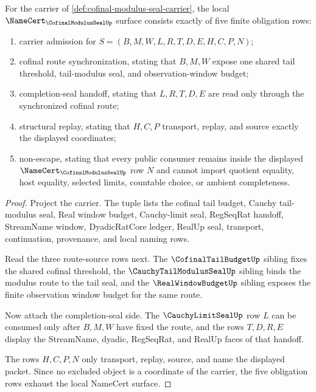 \begin{theorem}
\label{thm:cofinal-modulus-seal-namecert-obligations}
For the carrier of \autoref{def:cofinal-modulus-seal-carrier}, the local $\NameCert_{\CofinalModulusSealUp}$ surface consists exactly of five finite obligation rows:
\begin{enumerate}
\item carrier admission for $S=(B,M,W,L,R,T,D,E,H,C,P,N)$;
\item cofinal route synchronization, stating that $B,M,W$ expose one shared tail threshold, tail-modulus seal, and observation-window budget;
\item completion-seal handoff, stating that $L,R,T,D,E$ are read only through the synchronized cofinal route;
\item structural replay, stating that $H,C,P$ transport, replay, and source exactly the displayed coordinates;
\item non-escape, stating that every public consumer remains inside the displayed $\NameCert_{\CofinalModulusSealUp}$ row $N$ and cannot import quotient equality, host equality, selected limits, countable choice, or ambient completeness.
\end{enumerate}
\end{theorem}
\begin{proof}
Project the carrier. The tuple lists the cofinal tail budget, Cauchy tail-modulus seal, Real window budget, Cauchy-limit seal, RegSeqRat handoff, StreamName window, DyadicRatCore ledger, RealUp seal, transport, continuation, provenance, and local naming rows.

Read the three route-source rows next. The $\CofinalTailBudgetUp$ sibling fixes the shared cofinal threshold, the $\CauchyTailModulusSealUp$ sibling binds the modulus route to the tail seal, and the $\RealWindowBudgetUp$ sibling exposes the finite observation window budget for the same route.

Now attach the completion-seal side. The $\CauchyLimitSealUp$ row $L$ can be consumed only after $B,M,W$ have fixed the route, and the rows $T,D,R,E$ display the StreamName, dyadic, RegSeqRat, and RealUp faces of that handoff.

The rows $H,C,P,N$ only transport, replay, source, and name the displayed packet. Since no excluded object is a coordinate of the carrier, the five obligation rows exhaust the local NameCert surface.
\end{proof}

